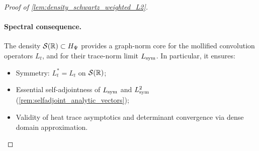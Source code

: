 \begin{proof}[Proof of \cref{lem:density_schwartz_weighted_L2}]
\paragraph{Spectral consequence.}
The density \( \mathcal{S}(\mathbb{R}) \subset H_{\Psi} \) provides a graph-norm core for the mollified convolution operators \( L_t \), and for their trace-norm limit \( L_{\mathrm{sym}} \). In particular, it ensures:
\begin{itemize}
  \item Symmetry: \( L_t^* = L_t \) on \( \mathcal{S}(\mathbb{R}) \);
  \item Essential self-adjointness of \( L_{\mathrm{sym}} \) and \( L_{\mathrm{sym}}^2 \) (\cref{rem:selfadjoint_analytic_vectors});
  \item Validity of heat trace asymptotics and determinant convergence via dense domain approximation.
\end{itemize}
\end{proof}
